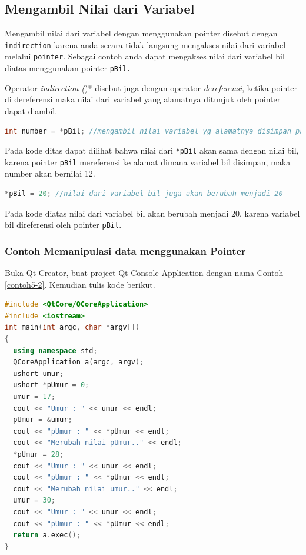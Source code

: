 \subsection{Mengambil Nilai dari
Variabel}\label{mengambil-nilai-dari-variabel}

Mengambil nilai dari variabel dengan menggunakan pointer disebut dengan
\texttt{indirection} karena anda secara tidak langsung mengakses nilai
dari variabel melalui \texttt{pointer}. Sebagai contoh anda dapat
mengakses nilai dari variabel bil diatas menggunakan pointer
\texttt{pBil.}

Operator \emph{indirection (})* disebut juga dengan operator
\emph{dereferensi}, ketika pointer di dereferensi maka nilai dari
variabel yang alamatnya ditunjuk oleh pointer dapat diambil.

\begin{lstlisting}[language=c++, numbers=none]
int number = *pBil; //mengambil nilai variabel yg alamatnya disimpan padapointer pBil
\end{lstlisting}

Pada kode ditas dapat dilihat bahwa nilai dari \texttt{*pBil} akan sama
dengan nilai bil, karena pointer \texttt{pBil} mereferensi ke alamat
dimana variabel bil disimpan, maka number akan bernilai 12.

\begin{lstlisting}[language=c++, numbers=none]
*pBil = 20; //nilai dari variabel bil juga akan berubah menjadi 20
\end{lstlisting}

Pada kode diatas nilai dari variabel bil akan berubah menjadi 20, karena
variabel bil direferensi oleh pointer \texttt{pBil}.

\subsubsection*{Contoh  Memanipulasi data menggunakan Pointer}

Buka Qt Creator, buat project Qt Console Application dengan nama Contoh
\ref{contoh5-2}. Kemudian tulis kode berikut.

\begin{lstlisting}[language=c++, caption=Memanipulasi data menggunakan Pointer, label=contoh5-2]
#include <QtCore/QCoreApplication>
#include <iostream>
int main(int argc, char *argv[])
{
  using namespace std;
  QCoreApplication a(argc, argv);
  ushort umur;
  ushort *pUmur = 0;
  umur = 17;
  cout << "Umur : " << umur << endl;
  pUmur = &umur;
  cout << "pUmur : " << *pUmur << endl;
  cout << "Merubah nilai pUmur.." << endl;
  *pUmur = 28;
  cout << "Umur : " << umur << endl;
  cout << "pUmur : " << *pUmur << endl;
  cout << "Merubah nilai umur.." << endl;
  umur = 30;
  cout << "Umur : " << umur << endl;
  cout << "pUmur : " << *pUmur << endl;
  return a.exec();
}
\end{lstlisting}

